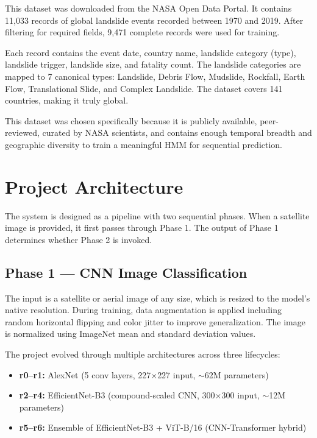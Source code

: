 \documentclass[11pt]{article}
\begin{document}
This dataset was downloaded from the NASA Open Data Portal. It contains 11,033 records of global landslide events recorded between 1970 and 2019. After filtering for required fields, 9,471 complete records were used for training.

Each record contains the event date, country name, landslide category (type), landslide trigger, landslide size, and fatality count. The landslide categories are mapped to 7 canonical types: Landslide, Debris Flow, Mudslide, Rockfall, Earth Flow, Translational Slide, and Complex Landslide. The dataset covers 141 countries, making it truly global.

This dataset was chosen specifically because it is publicly available, peer-reviewed, curated by NASA scientists, and contains enough temporal breadth and geographic diversity to train a meaningful HMM for sequential prediction.

\section{Project Architecture}

The system is designed as a pipeline with two sequential phases. When a satellite image is provided, it first passes through Phase 1. The output of Phase 1 determines whether Phase 2 is invoked.

\subsection{Phase 1 --- CNN Image Classification}

The input is a satellite or aerial image of any size, which is resized to the model's native resolution. During training, data augmentation is applied including random horizontal flipping and color jitter to improve generalization. The image is normalized using ImageNet mean and standard deviation values.

The project evolved through multiple architectures across three lifecycles:
\begin{itemize}[noitemsep]
    \item \textbf{r0--r1:} AlexNet (5 conv layers, 227$\times$227 input, $\sim$62M parameters)
    \item \textbf{r2--r4:} EfficientNet-B3 (compound-scaled CNN, 300$\times$300 input, $\sim$12M parameters)
    \item \textbf{r5--r6:} Ensemble of EfficientNet-B3 + ViT-B/16 (CNN-Transformer hybrid)
\end{itemize}
\end{document}
